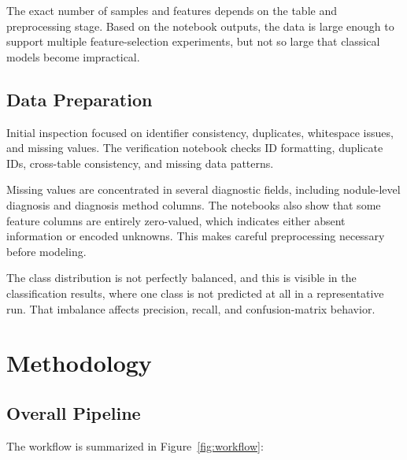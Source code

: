 \documentclass[11pt,a4paper]{article}
\begin{document}
The exact number of samples and features depends on the table and preprocessing stage. Based on the notebook outputs, the data is large enough to support multiple feature-selection experiments, but not so large that classical models become impractical.

\subsection{Data Preparation}


Initial inspection focused on identifier consistency, duplicates, whitespace issues, and missing values. The verification notebook checks ID formatting, duplicate IDs, cross-table consistency, and missing data patterns.

Missing values are concentrated in several diagnostic fields, including nodule-level diagnosis and diagnosis method columns. The notebooks also show that some feature columns are entirely zero-valued, which indicates either absent information or encoded unknowns. This makes careful preprocessing necessary before modeling.

The class distribution is not perfectly balanced, and this is visible in the classification results, where one class is not predicted at all in a representative run. That imbalance affects precision, recall, and confusion-matrix behavior.

\section{Methodology}
\subsection{Overall Pipeline}


The workflow is summarized in Figure~\ref{fig:workflow}:
\end{document}
